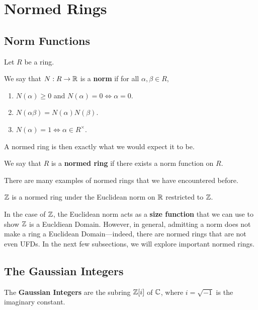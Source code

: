 \section{Normed Rings}\label{Ch2:Sec:Norms}

\subsection{Norm Functions}

Let $R$ be a ring.

\begin{boxdefinition}[Norm]
    We say that $N : R \to \mathbb{R}$ is a \textbf{norm} if for all $\alpha, \beta \in R$,
    \begin{enumerate}[noitemsep]
        \item $N(\alpha) \geq 0$ and $N(\alpha) = 0 \iff \alpha = 0$.
        \item $N(\alpha \beta) = N(\alpha) N(\beta)$.
        \item $N(\alpha) = 1 \iff \alpha \in R^{\times}$.
    \end{enumerate}
\end{boxdefinition}

A normed ring is then exactly what we would expect it to be.

\begin{boxdefinition}
    We say that $R$ is a \textbf{normed ring} if there exists a norm function on $R$.
\end{boxdefinition}

There are many examples of normed rings that we have encountered before.

\begin{boxexample}
    $\mathbb{Z}$ is a normed ring under the Euclidean norm on $\mathbb{R}$ restricted to $\mathbb{Z}$.
\end{boxexample}

In the case of $\mathbb{Z}$, the Euclidean norm acts as a \textbf{size function} that we can use to show $\mathbb{Z}$ is a Eucldiean Domain. However, in general, admitting a norm does not make a ring a Euclidean Domain---indeed, there are normed rings that are not even UFDs. In the next few subsections, we will explore important normed rings.

\subsection{The Gaussian Integers}

\begin{boxdefinition}
    The \textbf{Gaussian Integers} are the subring $\mathbb{Z}\!\left[ i \right]$ of $\mathbb{C}$, where $i = \sqrt{-1}$ is the imaginary constant.
\end{boxdefinition}

